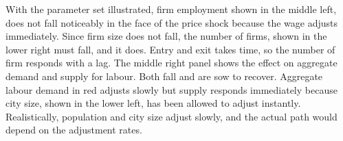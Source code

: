 With the parameter set illustrated, firm employment shown in the middle left, does not fall noticeably in the face of the price shock because the wage adjusts immediately.  Since firm size does not fall, the number of firms, shown in the lower right must fall, and it does. Entry and exit takes time, so the number of firm responds with a lag. 
The middle right panel shows the effect  on aggregate demand and supply for labour. Both fall and are sow to recover. Aggregate labour demand in red adjusts slowly but supply responds immediately because city size, shown in the lower left,  has been allowed to adjust instantly. Realistically, population and city size adjust slowly, and the actual path would depend on the adjustment rates.


